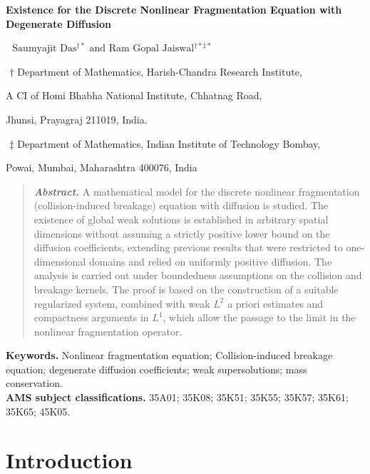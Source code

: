 \documentclass[a4paper,12pt,reqno]{amsart}
\theoremstyle{plain}
\numberwithin{equation}{section}
\begin{document}
 
	\begin{center}
		\Large{\textbf{Existence for the Discrete Nonlinear Fragmentation Equation with Degenerate Diffusion}}
	\end{center} 
	\medskip
	\medskip
	\centerline{${\text{ ${\text{Saumyajit Das$^{\dagger*}$}}$ and  Ram Gopal Jaiswal$^{\dagger*\ddagger*}$}}$}\let\thefootnote\relax{}
	\medskip
	{\footnotesize
		
		
		\centerline{ ${}^{}$  $\dagger$ Department of Mathematics, Harish-Chandra Research Institute,}
		\centerline{ A CI of Homi
			Bhabha National Institute, Chhatnag Road,}
		\centerline{Jhunsi, Prayagraj 211019, India.}
		\centerline{ ${}^{}$  $\ddagger$ Department of Mathematics, Indian Institute of Technology Bombay,}
		\centerline{Powai, Mumbai, Maharashtra 400076, India}
		
	}
	\bigskip
	\begin{quote}
		{\small {\em \bf Abstract.} 
			A mathematical model for the discrete nonlinear fragmentation (collision-induced breakage) equation with diffusion is studied. The existence of global weak solutions is established in arbitrary spatial dimensions without assuming a strictly positive lower bound on the diffusion coefficients, extending previous results that were restricted to one-dimensional domains and relied on uniformly positive diffusion. The analysis is carried out under boundedness assumptions on the collision and breakage kernels. The proof is based on the construction of a suitable regularized system, combined with weak $L^2$ a priori estimates and compactness arguments in $L^1$, which allow the passage to the limit in the nonlinear fragmentation operator.}
	\end{quote}
	\vspace{0.5cm}
	\textbf{Keywords.} Nonlinear fragmentation equation; Collision-induced breakage equation; degenerate diffusion coefficients; weak supersolutions; mass conservation.\\
	\textbf{AMS subject classifications.} 35A01; 35K08; 35K51; 35K55; 	35K57; 35K61; 35K65; 45K05.
	\section{\textbf{Introduction}}\label{sec:intro}
	
\end{document}
